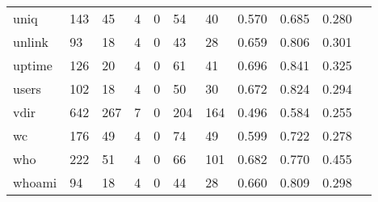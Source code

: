 \begin{longtable}{lp{1.10cm}p{1.10cm}p{1.10cm}p{1.10cm}p{1.10cm}p{1.10cm}p{1.10cm}p{1.10cm}p{1.10cm}p{1.10cm}}
uniq      &                    143 &                                 45 &                                 4 &                                0 &                                54 &                              40 &                          0.570 &                                 0.685 &                               0.280 \\
unlink    &                     93 &                                 18 &                                 4 &                                0 &                                43 &                              28 &                          0.659 &                                 0.806 &                               0.301 \\
uptime    &                    126 &                                 20 &                                 4 &                                0 &                                61 &                              41 &                          0.696 &                                 0.841 &                               0.325 \\
users     &                    102 &                                 18 &                                 4 &                                0 &                                50 &                              30 &                          0.672 &                                 0.824 &                               0.294 \\
vdir      &                    642 &                                267 &                                 7 &                                0 &                               204 &                             164 &                          0.496 &                                 0.584 &                               0.255 \\
wc        &                    176 &                                 49 &                                 4 &                                0 &                                74 &                              49 &                          0.599 &                                 0.722 &                               0.278 \\
who       &                    222 &                                 51 &                                 4 &                                0 &                                66 &                             101 &                          0.682 &                                 0.770 &                               0.455 \\
whoami    &                     94 &                                 18 &                                 4 &                                0 &                                44 &                              28 &                          0.660 &                                 0.809 &                               0.298 \\

\end{longtable}
